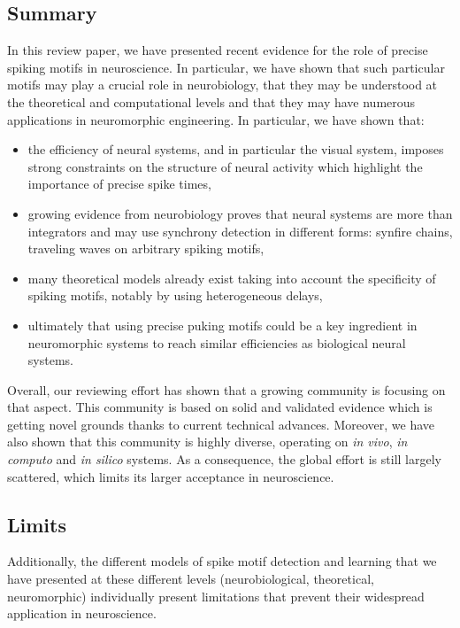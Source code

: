 \documentclass[brainsci, %
               review,submit,pdftex,moreauthors
               ]{Definitions/mdpi}
\begin{document}
\subsection{Summary}
In this review paper, we have presented recent evidence for the role of precise spiking motifs in neuroscience. In particular, we have shown that such particular motifs may play a crucial role in neurobiology, that they may be understood at the theoretical and computational levels and that they may have numerous applications in neuromorphic engineering. In particular, we have shown that:
\begin{itemize}
  \item  the efficiency of neural systems, and in particular the visual system, imposes strong constraints on the structure of neural activity which highlight the importance of precise spike times,
  \item  growing evidence from neurobiology proves that neural systems are more than integrators and may use synchrony detection in different forms: synfire chains, traveling waves on arbitrary spiking motifs,
  \item  many theoretical models already exist taking into account the specificity of spiking motifs, notably by using heterogeneous delays,
  \item  ultimately that using precise puking motifs could be a key ingredient in neuromorphic systems to reach similar efficiencies as biological neural systems.
\end{itemize}
 Overall, our reviewing effort has shown that a growing community is focusing on that aspect. This community is based on solid and validated evidence which is getting novel grounds thanks to current technical advances. Moreover, we have also shown that this community is highly diverse, operating on \emph{in vivo}, \emph{in computo} and \emph{in silico} systems. As a consequence, the global effort is still largely scattered, which limits its larger acceptance in neuroscience. 

\subsection{Limits}
Additionally, the different models of spike motif detection and learning that we have presented at these different levels (neurobiological, theoretical, neuromorphic) individually present limitations that prevent their widespread application in neuroscience.
\end{document}
